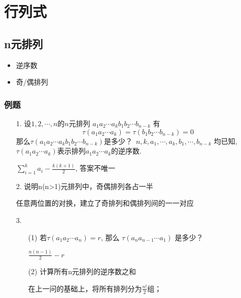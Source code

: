 \chapter{行列式}
\section{n元排列}
\begin{itemize}
    \item 逆序数
    \item 奇/偶排列
\end{itemize}

\subsection*{例题}
\begin{itemize}
    \item[1.] 设$1,2,\cdots,n$的$n$元排列
    $a_1a_2\cdots a_k b_1b_2\cdots b_{n-k}$
    有$$\tau(a_1a_2\cdots a_k) = \tau(b_1b_2\cdots b_{n-k}) = 0$$
    那么$\tau(a_1a_2\cdots a_k b_1b_2\cdots b_{n-k})$是多少？
    \,$n,k,a_1,\cdots,a_k, b_1, \cdots, b_{n-k}$
    均已知,\,$\tau(a_1a_2\cdots a_k)$表示排列$a_1a_2\cdots a_k$的逆序数.
	\begin{solution}
		$\sum_{i=1}^k a_i - \frac{k(k+1)}{2}$, 答案不唯一
	\end{solution}
    \vspace{2cm}

    \item[2.] 说明n(n>1)元排列中，奇偶排列各占一半
	\begin{solution}
		任意两位置的对换，建立了奇排列和偶排列间的一一对应
	\end{solution}
    \vspace{1.5cm}

    \item[3.]
    \begin{itemize}
        \item[(1)] 若$\tau(a_1a_2\cdots a_n) = r$, 那么
        $\tau(a_na_{n-1}\cdots a_1)$ 是多少？
		\begin{solution}
			$\frac{n(n-1)}{2} - r$
		\end{solution}
        \vspace{1.5cm}
        \item[(2)] 计算所有n元排列的逆序数之和
		\begin{solution}
			在上一问的基础上，将所有排列分为$\frac{n!}{2}$组；
		\end{solution}
        \vspace{1.5cm}
    \end{itemize} 
\end{itemize}

